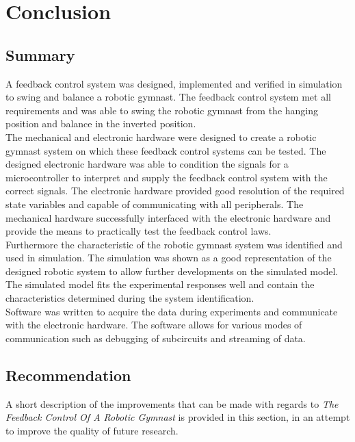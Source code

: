 \chapter{Conclusion}
\label{chp:conclusion}



\section{Summary}
A feedback control system was designed, implemented and verified in simulation to swing and balance a robotic gymnast. The feedback control system met all requirements and was able to swing the robotic gymnast from the hanging position and balance in the inverted position.\\
 
The mechanical and electronic hardware were designed to create a robotic gymnast system on which these feedback control systems can be tested. The designed electronic hardware was able to condition the signals for a microcontroller to interpret and supply the feedback control system with the correct signals. The electronic hardware provided good resolution of the required state variables and capable of communicating with all peripherals. The mechanical hardware successfully interfaced with the electronic hardware and provide the means to practically test the feedback control laws.\\

Furthermore the characteristic of the robotic gymnast system was identified and used in simulation. The simulation was shown as a good representation of the designed robotic system to allow further developments on the simulated model. The simulated model fits the experimental responses well and contain the characteristics determined during the system identification.\\

Software was written to acquire the data during experiments and communicate with the electronic hardware. The software allows for various modes of communication such as debugging of subcircuits and streaming of data.\\

\section{Recommendation}
A short description of the improvements that can be made with regards to \textit{The Feedback Control Of A Robotic Gymnast} is provided in this section, in an attempt to improve the quality of future research.\\

